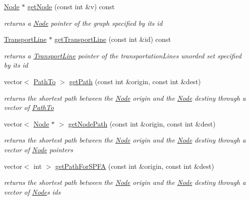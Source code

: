 \begin{DoxyCompactItemize}
\hyperlink{class_node}{Node} $\ast$ \hyperlink{class_graph_ae36f4cc1d89f8ea4fa79047769df3d81}{get\+Node} (const int \&v) const
\begin{DoxyCompactList}\small\item\em returns a \hyperlink{class_node}{Node} pointer of the graph specified by its id \end{DoxyCompactList}\item 
\hyperlink{class_transport_line}{Transport\+Line} $\ast$ \hyperlink{class_graph_a5256503fd14b7a56bce1da737ec223c1}{get\+Transport\+Line} (const int \&id) const
\begin{DoxyCompactList}\small\item\em returns a \hyperlink{class_transport_line}{Transport\+Line} pointer of the transportation\+Lines unorded set specified by its id \end{DoxyCompactList}\item 
vector$<$ \hyperlink{struct_path_to}{Path\+To} $>$ \hyperlink{class_graph_a85090885772616dc5865c500a9af81b6}{get\+Path} (const int \&origin, const int \&dest)
\begin{DoxyCompactList}\small\item\em returns the shortest path between the \hyperlink{class_node}{Node} origin and the \hyperlink{class_node}{Node} destiny through a vector of \hyperlink{struct_path_to}{Path\+To} \end{DoxyCompactList}\item 
vector$<$ \hyperlink{class_node}{Node} $\ast$ $>$ \hyperlink{class_graph_a3afc621123c6232274a883df378e4b72}{get\+Node\+Path} (const int \&origin, const int \&dest)
\begin{DoxyCompactList}\small\item\em returns the shortest path between the \hyperlink{class_node}{Node} origin and the \hyperlink{class_node}{Node} destiny through a vector of \hyperlink{class_node}{Node} pointers \end{DoxyCompactList}\item 
vector$<$ int $>$ \hyperlink{class_graph_a82d46b15dc3938a1f8b9baa465dda9d1}{get\+Path\+For\+S\+P\+FA} (const int \&origin, const int \&dest)
\begin{DoxyCompactList}\small\item\em returns the shortest path between the \hyperlink{class_node}{Node} origin and the \hyperlink{class_node}{Node} destiny through a vector of \hyperlink{class_node}{Node}\textquotesingle{}s ids \end{DoxyCompactList}\item 

\end{DoxyCompactItemize}
